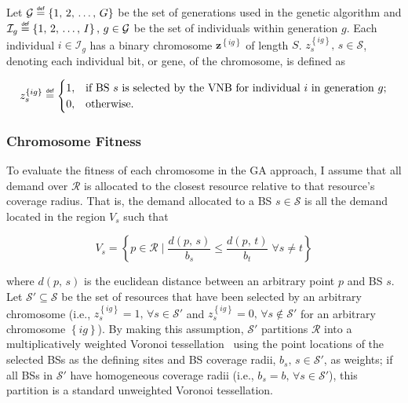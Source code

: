 \documentclass[12pt,dvipsnames]{report}
\newif\ifisdoublespacing
\newcommand\defeq{\mathrel{\overset{\makebox[0pt]{\mbox{\normalfont\tiny\sffamily def}}}{=}}}
\begin{document}
Let $\mathcal{G} \defeq \left\{ 1,\, 2,\, \ldots,\, G \right\}$ be the set of generations used in the genetic algorithm and $\mathcal{I}_g \defeq \left\{ 1,\, 2,\, \ldots,\, I \right\},\, g \in \mathcal{G}$ be the set of individuals within generation $g$.  Each individual $i \in \mathcal{I}_g$ has a binary chromosome $\textbf{z}^{\left\{ ig \right\}}$ of length $S$.  $z_s^{\left\{ ig \right\}},\, s \in \mathcal{S}$, denoting each individual bit, or gene, of the chromosome, is defined as

\ifisdoublespacing
\begin{singlespacing}
\begin{equation}
z_s^{\left\{ ig \right\}} \defeq
	\begin{cases}
		1,& \text{if BS $s$ is selected by the VNB for individual $i$ in generation $g$;}\\
		\\
		0,& \text{otherwise.}
	\end{cases}
\end{equation}
\end{singlespacing}
\else
\begin{equation}
z_s^{\left\{ ig \right\}} \defeq
	\begin{cases}
		1,& \text{if BS $s$ is selected by the VNB for individual $i$ in generation $g$;}\\
		0,& \text{otherwise.}
	\end{cases}
\end{equation}
\fi

\subsubsection{Chromosome Fitness}

To evaluate the fitness of each chromosome in the GA approach, I assume that all demand over $\mathcal{R}$ is allocated to the closest resource relative to that resource's coverage radius.  That is, the demand allocated to a BS $s \in \mathcal{S}$ is all the demand located in the region $V_s$ such that

\begin{equation}
V_s = \left\{ p \in \mathcal{R} \mid \frac{d \left( p,\, s \right)}{b_s} \leq \frac{d \left( p,\, t \right)}{b_t} \; \forall s \neq t \right\}
\end{equation}

\noindent where $d \left( p,\, s \right)$ is the euclidean distance between an arbitrary point $p$ and BS $s$.  Let $\mathcal{S}' \subseteq \mathcal{S}$ be the set of resources that have been selected by an arbitrary chromosome (i.e., $z_s^{\left\{ ig \right\}} = 1,\, \forall s \in \mathcal{S}'$ and $z_s^{\left\{ ig \right\}} = 0,\, \forall s \not\in \mathcal{S}'$ for an arbitrary chromosome $\left\{ ig \right\}$).  By making this assumption, $\mathcal{S}'$ partitions $\mathcal{R}$ into a multiplicatively weighted Voronoi tessellation~\cite{Dobrin_areview,AURENHAMMER1984251} using the point locations of the selected BSs as the defining sites and BS coverage radii, $b_s,\, s \in \mathcal{S}'$, as weights; if all BSs in $\mathcal{S}'$ have homogeneous coverage radii (i.e., $b_s = b,\, \forall s \in \mathcal{S}'$), this partition is a standard unweighted Voronoi tessellation.
\end{document}

